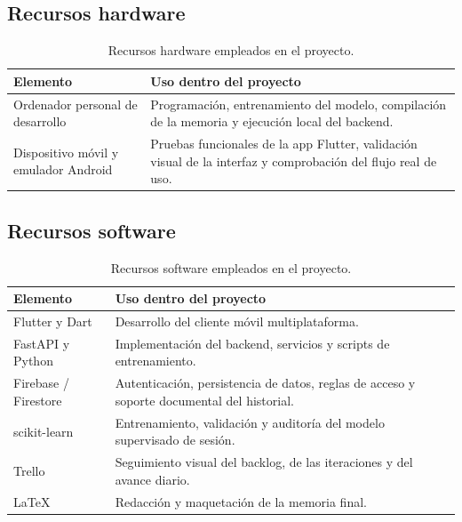 \subsection*{Recursos hardware}

\begin{table}[H]
\centering
\small
\renewcommand{\arraystretch}{1.1}
\begin{tabularx}{\textwidth}{|P{3.2cm}|Y|}
\hline
\textbf{Elemento} & \textbf{Uso dentro del proyecto} \\
\hline
Ordenador personal de desarrollo & Programación, entrenamiento del modelo, compilación de la memoria y ejecución local del backend. \\
\hline
Dispositivo móvil y emulador Android & Pruebas funcionales de la app Flutter, validación visual de la interfaz y comprobación del flujo real de uso. \\
\hline
\end{tabularx}
\caption{Recursos hardware empleados en el proyecto.}
\label{tab:recursos_hardware}
\end{table}

\subsection*{Recursos software}

\begin{table}[H]
\centering
\small
\renewcommand{\arraystretch}{1.1}
\begin{tabularx}{\textwidth}{|P{3.2cm}|Y|}
\hline
\textbf{Elemento} & \textbf{Uso dentro del proyecto} \\
\hline
Flutter y Dart & Desarrollo del cliente móvil multiplataforma. \\
\hline
FastAPI y Python & Implementación del backend, servicios y scripts de entrenamiento. \\
\hline
Firebase / Firestore & Autenticación, persistencia de datos, reglas de acceso y soporte documental del historial. \\
\hline
scikit-learn & Entrenamiento, validación y auditoría del modelo supervisado de sesión. \\
\hline
Trello & Seguimiento visual del backlog, de las iteraciones y del avance diario. \\
\hline
\LaTeX & Redacción y maquetación de la memoria final. \\
\hline
\end{tabularx}
\caption{Recursos software empleados en el proyecto.}
\label{tab:recursos_software}
\end{table}

